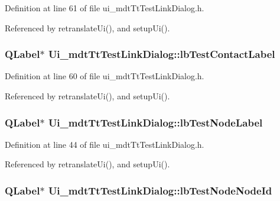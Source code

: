 Definition at line 61 of file ui\-\_\-mdt\-Tt\-Test\-Link\-Dialog.\-h.



Referenced by retranslate\-Ui(), and setup\-Ui().

\hypertarget{class_ui__mdt_tt_test_link_dialog_aa0529fd27d9ca0fc952ea38ad7d71df9}{
\subsubsection[{lb\-Test\-Contact\-Label}]{\setlength{\rightskip}{0pt plus 5cm}Q\-Label$\ast$ Ui\-\_\-mdt\-Tt\-Test\-Link\-Dialog\-::lb\-Test\-Contact\-Label}}\label{class_ui__mdt_tt_test_link_dialog_aa0529fd27d9ca0fc952ea38ad7d71df9}


Definition at line 60 of file ui\-\_\-mdt\-Tt\-Test\-Link\-Dialog.\-h.



Referenced by retranslate\-Ui(), and setup\-Ui().

\hypertarget{class_ui__mdt_tt_test_link_dialog_a1b491804bee627c0517f0cfd47d19bab}{
\subsubsection[{lb\-Test\-Node\-Label}]{\setlength{\rightskip}{0pt plus 5cm}Q\-Label$\ast$ Ui\-\_\-mdt\-Tt\-Test\-Link\-Dialog\-::lb\-Test\-Node\-Label}}\label{class_ui__mdt_tt_test_link_dialog_a1b491804bee627c0517f0cfd47d19bab}


Definition at line 44 of file ui\-\_\-mdt\-Tt\-Test\-Link\-Dialog.\-h.



Referenced by retranslate\-Ui(), and setup\-Ui().

\hypertarget{class_ui__mdt_tt_test_link_dialog_ad647c1e4793f1e4a324cbdb026dcd605}{
\subsubsection[{lb\-Test\-Node\-Node\-Id}]{\setlength{\rightskip}{0pt plus 5cm}Q\-Label$\ast$ Ui\-\_\-mdt\-Tt\-Test\-Link\-Dialog\-::lb\-Test\-Node\-Node\-Id}}\label{class_ui__mdt_tt_test_link_dialog_ad647c1e4793f1e4a324cbdb026dcd605}


